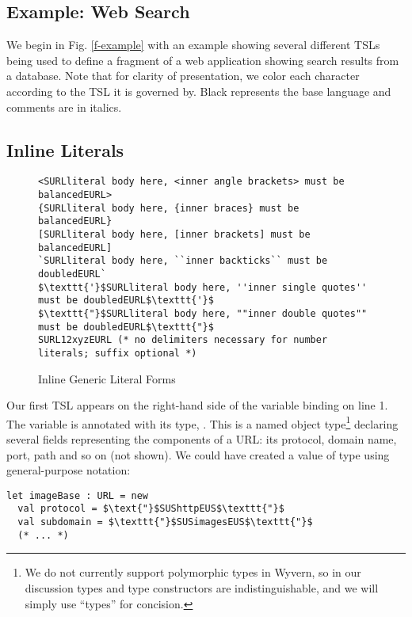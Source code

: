 \subsection{Example: Web Search}
We begin in Fig. \ref{f-example} with an example showing several different TSLs being used to define a fragment of a web application showing search results from a database. Note that for clarity of presentation, we color each character  according to the TSL it is governed by. Black represents the base language and comments are in italics.

\subsection{Inline Literals}
\begin{figure}[t]
\begin{lstlisting}[numbers=none]
<SURLliteral body here, <inner angle brackets> must be balancedEURL>
{SURLliteral body here, {inner braces} must be balancedEURL}
[SURLliteral body here, [inner brackets] must be balancedEURL]
`SURLliteral body here, ``inner backticks`` must be doubledEURL`
$\texttt{'}$SURLliteral body here, ''inner single quotes'' must be doubledEURL$\texttt{'}$
$\texttt{"}$SURLliteral body here, ""inner double quotes"" must be doubledEURL$\texttt{"}$
SURL12xyzEURL (* no delimiters necessary for number literals; suffix optional *)
\end{lstlisting}
\vspace{-8px}
\caption{Inline Generic Literal Forms}
\label{f-delims}
\end{figure}
Our first TSL appears on the right-hand side of the variable binding on line 1. The variable  is annotated with its type, . This is a named {object type}\footnote{We do not currently support polymorphic types in Wyvern, so in our discussion types and type constructors are indistinguishable, and we will simply use ``types'' for concision.} declaring several fields representing the components of a URL: its protocol, domain name, port, path and so on (not shown). We could have created a value of type  using general-purpose notation:
\begin{lstlisting}
let imageBase : URL = new
  val protocol = $\text{"}$SUShttpEUS$\texttt{"}$
  val subdomain = $\texttt{"}$SUSimagesEUS$\texttt{"}$
  (* ... *)
\end{lstlisting}
